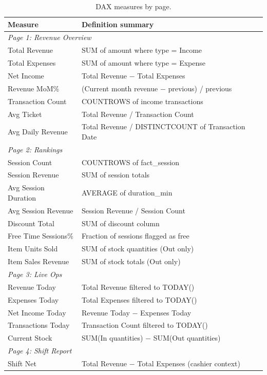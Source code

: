 \documentclass[12pt, a4paper]{report}
\begin{document}
\begin{table}[H]
  \centering
  \caption{DAX measures by page.\label{tab:dax_measures}}
  \begin{tabular}{p{4.5cm} p{8.5cm}}
    \toprule
    \textbf{Measure} & \textbf{Definition summary} \\
    \midrule
    \multicolumn{2}{l}{\textit{Page 1: Revenue Overview}} \\
    Total Revenue        & SUM of amount where type = Income \\
    Total Expenses       & SUM of amount where type = Expense \\
    Net Income           & Total Revenue $-$ Total Expenses \\
    Revenue MoM\%        & (Current month revenue $-$ previous) / previous \\
    Transaction Count    & COUNTROWS of income transactions \\
    Avg Ticket           & Total Revenue / Transaction Count \\
    Avg Daily Revenue    & Total Revenue / DISTINCTCOUNT of Transaction Date \\
    \midrule
    \multicolumn{2}{l}{\textit{Page 2: Rankings}} \\
    Session Count          & COUNTROWS of fact\_session \\
    Session Revenue        & SUM of session totals \\
    Avg Session Duration   & AVERAGE of duration\_min \\
    Avg Session Revenue    & Session Revenue / Session Count \\
    Discount Total         & SUM of discount column \\
    Free Time Sessions\%   & Fraction of sessions flagged as free \\
    Item Units Sold        & SUM of stock quantities (Out only) \\
    Item Sales Revenue     & SUM of stock totals (Out only) \\
    \midrule
    \multicolumn{2}{l}{\textit{Page 3: Live Ops}} \\
    Revenue Today          & Total Revenue filtered to TODAY() \\
    Expenses Today         & Total Expenses filtered to TODAY() \\
    Net Income Today       & Revenue Today $-$ Expenses Today \\
    Transactions Today     & Transaction Count filtered to TODAY() \\
    Current Stock          & SUM(In quantities) $-$ SUM(Out quantities) \\
    \midrule
    \multicolumn{2}{l}{\textit{Page 4: Shift Report}} \\
    Shift Net              & Total Revenue $-$ Total Expenses (cashier context) \\
    \bottomrule
  \end{tabular}
\end{table}
\end{document}
